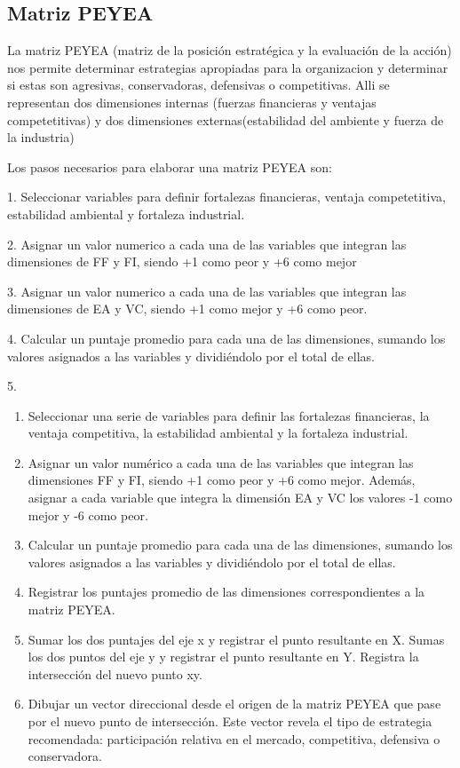\subsection{Matriz PEYEA}

La matriz PEYEA (matriz de la posición estratégica y la evaluación de la acción) nos permite determinar estrategias apropiadas para la organizacion y determinar si estas son agresivas, conservadoras, defensivas o competitivas. Alli se representan dos dimensiones internas (fuerzas financieras y ventajas competetitivas) y dos dimensiones externas(estabilidad del ambiente y fuerza de la industria) 

Los pasos necesarios para elaborar una matriz PEYEA son:

1. Seleccionar variables para definir fortalezas financieras, ventaja competetitiva, estabilidad ambiental y fortaleza industrial.

2. Asignar un valor numerico a cada una de las variables que integran las dimensiones de FF y FI, siendo +1 como peor y +6 como mejor

3. Asignar un valor numerico a cada una de las variables que integran las dimensiones de EA y VC, siendo +1 como mejor y +6 como peor.

4. Calcular un puntaje promedio para cada una de las dimensiones, sumando los valores asignados a las variables y dividiéndolo por el total de ellas.

5. 



\begin{enumerate}
    \item Seleccionar una serie de variables para definir las fortalezas financieras, la ventaja competitiva, la estabilidad ambiental y la fortaleza industrial.
    
    \item Asignar un valor numérico a cada una de las variables que integran las dimensiones FF y FI, siendo +1 como peor y +6 como mejor. Además, asignar a cada variable que integra la dimensión EA y VC los valores -1 como mejor y -6 como peor.
    
    \item Calcular un puntaje promedio para cada una de las dimensiones, sumando los valores asignados a las variables y dividiéndolo por el total de ellas.
    
    \item Registrar los puntajes promedio de las dimensiones correspondientes a la matriz PEYEA.
    
    \item Sumar los dos puntajes del eje x y registrar el punto resultante en X. Sumas los dos puntos del eje y y registrar el punto resultante en Y. Registra la intersección del nuevo punto xy.
    
    \item Dibujar un vector direccional desde el origen de la matriz PEYEA que pase por el nuevo punto de intersección. Este vector revela el tipo de estrategia recomendada: participación relativa en el mercado, competitiva, defensiva o conservadora.
\end{enumerate}

